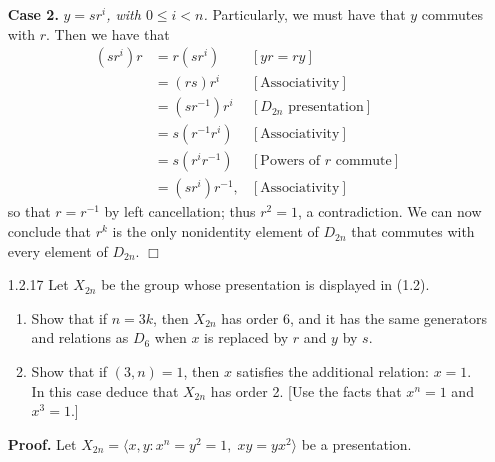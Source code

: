 \documentclass[9pt]{article}
\newcommand{\qed}{\hfill \ensuremath{\Box}}
\newcommand{\cyc}[1]{\langle #1 \rangle}
\begin{document}
\begin{enumerate}
      \textbf{Case 2.} \textit{$y = sr^i$, with $0 \le i < n$.} Particularly, we
      must have that $y$ commutes with $r$. Then we have that
      \begin{align*}
         (sr^i)r &= r(sr^i) &[yr = ry] \\
                 &= (rs)r^i &[\text{Associativity}] \\
                 &= (sr^{-1})r^i &[D_{2n}\text{ presentation}] \\
                 &= s(r^{-1}r^i) &[\text{Associativity}] \\
                 &= s(r^ir^{-1}) &[\text{Powers of $r$ commute}] \\
                 &= (sr^i)r^{-1}, &[\text{Associativity}]
      \end{align*}
      so that $r = r^{-1}$ by left cancellation; thus $r^2 = 1$, a
      contradiction. We can now conclude that $r^k$ is the only nonidentity
      element of $D_{2n}$ that commutes with every element of $D_{2n}$. \qed
   \item[1.2.17]  Let $X_{2n}$ be the group whose presentation
                                  is displayed in (1.2).
                  \begin{enumerate}
                     \item Show that if $n = 3k$, then $X_{2n}$ has order 6, and
                           it has the same generators and relations as $D_6$
                           when $x$ is replaced by $r$ and $y$ by $s$.
                     \item Show that if $(3, n) = 1$, then $x$ satisfies the
                           additional relation: $x = 1$. In this case deduce
                           that $X_{2n}$ has order 2. [Use the facts that
                           $x^n = 1$ and $x^3 = 1$.]
                  \end{enumerate}

      \textbf{Proof.} Let $X_{2n} = \cyc{x, y :  x^n = y^2 = 1, \;xy = yx^2}$ be
      a presentation.


\end{enumerate}
\end{document}
